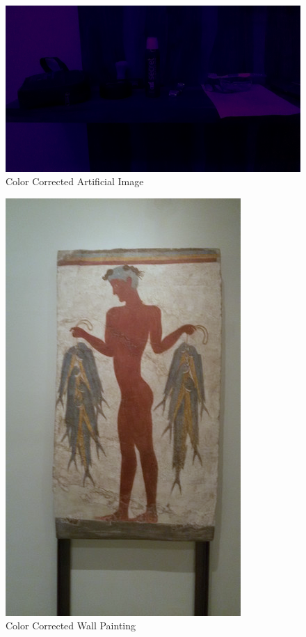 \documentclass[]{article}
\begin{document}
\begin{figure}[h!]
  \begin{center}
    \includegraphics[scale=0.4]{self_recons_artificial}
    \caption[p3]{Color Corrected Artificial Image}
  \end{center}
\end{figure}
\begin{figure}[h!]
  \begin{center}
    \includegraphics[scale=0.4]{self_recons_thera}
    \caption[p3]{Color Corrected Wall Painting}
  \end{center}
\end{figure}
\end{document}
